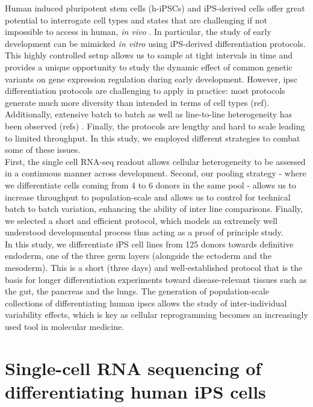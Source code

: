 Human induced pluripotent stem cells (h-iPSCs) and iPS-derived cells offer great potential to interrogate cell types and states that are challenging if not impossible to access in human, \textit{in vivo} \cite{kilpinen2017common}.
In particular, the study of early development can be mimicked \textit{in vitro} using iPS-derived differentiation protocols. 
This highly controlled setup allows us to sample at tight intervals in time and provides a unique opportunity to study the dynamic effect of common genetic variants on gene expression regulation during early development.
However, \gls{ipsc} differentiation protocols are challenging to apply in practice: most protocols generate much more diversity than intended in terms of cell types (ref). \cite{bock2011reference}
Additionally, extensive batch to batch as well as line-to-line heterogeneity has been observed (refs) \cite{schwartzentruber2018molecular}. 
Finally, the protocols are lengthy and hard to scale leading to limited throughput. 
In this study, we employed different strategies to combat some of these issues.\\ 

First, the single cell RNA-seq readout allows cellular heterogeneity to be assessed in a continuous manner across development.
Second, our pooling strategy - where we differentiate cells coming from 4 to 6 donors in the same pool - allows us to increase throughput to population-scale and allows us to control for technical batch to batch variation, enhancing the ability of inter line comparisons.
Finally, we selected a short and efficient protocol, which models an extremely well understood developmental process thus acting as a proof of principle study.\\

In this study, we differentiate iPS cell lines from 125 donors towards definitive endoderm, one of the three germ layers (alongside the ectoderm and the mesoderm). 
This is a short (three days) and well-established protocol \cite{hannan2013production} that is the basis for longer differentiation experiments toward disease-relevant tissues such as the gut, the pancreas and the lungs.
The generation of population-scale collections of differentiating human \gls{ipsc}s allows the study of inter-individual variability effects, which is key as cellular reprogramming becomes an increasingly used tool in molecular medicine.

\section{Single-cell RNA sequencing of differentiating human iPS cells}

